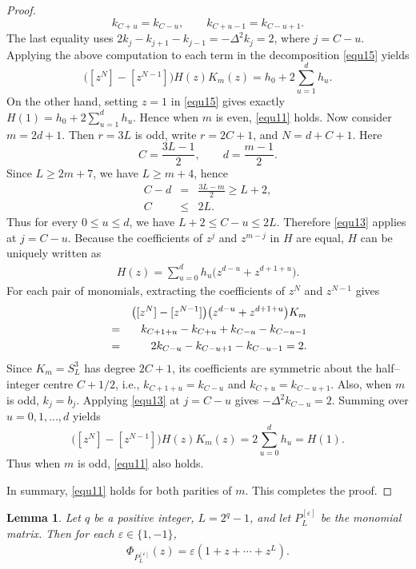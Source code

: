 \documentclass[11pt,a4paper]{article}
\newtheorem{lemma}[theorem]{Lemma}
\begin{document}
\begin{proof}
\[
  k_{C+u}=k_{C-u},
  \qquad
  k_{C+u-1}=k_{C-u+1}.
\]
The last equality uses $2k_j-k_{j+1}-k_{j-1}=-\Delta^2k_j=2$, where $j=C-u$.
Applying the above computation to each term in the decomposition \eqref{equ15} yields
\[
  \bigl([z^N]-[z^{N-1}]\bigr)H(z)K_m(z)
  =h_0+2\sum_{u=1}^{d}h_u.
\]
On the other hand, setting $z=1$ in \eqref{equ15} gives exactly
$H(1)=h_0+2\sum_{u=1}^dh_u$. Hence when $m$ is even, \eqref{equ11} holds.
Now consider $m=2d+1$. Then $r=3L$ is odd, write $r=2C+1$, and $N=d+C+1$. Here
\[
  C=\frac{3L-1}{2},\qquad d=\frac{m-1}{2}.
\]
Since $L\geq2m+7$, we have $L\geq m+4$, hence
\begin{eqnarray*}
  C-d&=&\frac{3L-m}{2}\geq L+2,\\
  C&\leq&2L.
\end{eqnarray*}
Thus for every $0\leq u\leq d$, we have $L+2\leq C-u\leq2L$. Therefore \eqref{equ13} applies at $j=C-u$. Because the coefficients of $z^j$ and $z^{m-j}$ in $H$ are equal, $H$ can be uniquely written as
\begin{eqnarray*}
  H(z)=\sum_{u=0}^{d}h_u
  \bigl(z^{d-u}+z^{d+1+u}\bigr).
\end{eqnarray*}
For each pair of monomials, extracting the coefficients of $z^N$ and $z^{N-1}$ gives
\begin{eqnarray*}
  &&\bigl([z^N]-[z^{N-1}]\bigr)
  \bigl(z^{d-u}+z^{d+1+u}\bigr)K_m\notag\\
  &=&k_{C+1+u}-k_{C+u}
       +k_{C-u}-k_{C-u-1}\notag\\
  &=&2k_{C-u}-k_{C-u+1}-k_{C-u-1}=2.
\end{eqnarray*}
Since $K_m=S_L^3$ has degree $2C+1$, its coefficients are symmetric about the half–integer centre $C+1/2$, i.e.,
$k_{C+1+u}=k_{C-u}$ and $k_{C+u}=k_{C-u+1}$.
Also, when $m$ is odd, $k_j=b_j$. Applying \eqref{equ13} at $j=C-u$ gives
$-\Delta^2k_{C-u}=2$. Summing over $u=0,1,\ldots,d$ yields
\[
  \bigl([z^N]-[z^{N-1}]\bigr)H(z)K_m(z)
  =2\sum_{u=0}^{d}h_u=H(1).
\]
Thus when $m$ is odd, \eqref{equ11} also holds.

In summary, \eqref{equ11} holds for both parities of $m$. This completes the proof. 
\end{proof}

\begin{lemma}\label{lem2.9}
Let $q$ be a positive integer, $L=2^q-1$, and let $P_L^{[\varepsilon]}$ be the monomial matrix. Then for each $\varepsilon\in\{1,-1\}$,
\begin{eqnarray*}
  \Phi_{P_L^{[\varepsilon]}}(z)
  =\varepsilon(1+z+\cdots+z^L).
\end{eqnarray*}
\end{lemma}
\end{document}
